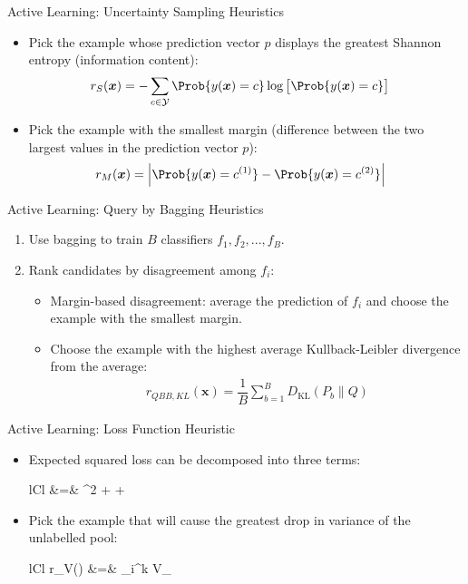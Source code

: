 \documentclass{beamer}
\newcommand{\Y}{\mathcal{Y}}
\newcommand{\Labelled}{\mathcal{L}}
\begin{document}
\begin{frame}{Active Learning: Uncertainty Sampling Heuristics}
	\begin{itemize}
		\item Pick the example whose prediction vector $p$ displays the greatest Shannon entropy
		(information content):
		\begin{align*}
			r_S(\bm{x}) &= -\sum_{c \in \Y} \Prob{y(\bm{x}) = c} \log \big[\Prob{y(\bm{x}) = c} \big]
		\end{align*}
		\item Pick the example with the smallest margin (difference between
		the two largest values in the prediction vector $p$):
		\begin{align*}
			r_M(\bm{x}) &= \Big|  \Prob{y(\bm{x}) = c^{(1)}} -  \Prob{y(\bm{x}) = c^{(2)}} \Big|
		\end{align*}
	\end{itemize}
\end{frame}


\begin{frame}{Active Learning: Query by Bagging Heuristics}
	\begin{enumerate}
		\item Use bagging to train $B$ classifiers $f_1, f_2, ..., f_B$.
		\item Rank candidates by disagreement among $f_i$:
		\begin{itemize}
			\item Margin-based disagreement: average the prediction of $f_i$ and choose the
			example with the smallest margin.
			\item Choose the example with the highest average Kullback-Leibler divergence
			from the average:
			\begin{align*}
				r_{QBB,KL}(\bm{x}) = \dfrac{1}{B} \sum_{b=1}^B D_{\mathrm{KL}}(P_b\|Q)
			\end{align*}
		\end{itemize}	
	\end{enumerate}
\end{frame}

\begin{frame}{Active Learning: Loss Function Heuristic}
	\begin{itemize}
		\item Expected squared loss can be decomposed into three terms:
		\begin{IEEEeqnarray*}{lCl}
			 &=& ^2 +  + 
		\end{IEEEeqnarray*}
		\item Pick the example that will cause the greatest drop in variance of the unlabelled pool:
			\begin{IEEEeqnarray*}{lCl}
				r_V() &=& \sum_i^k  V_{\Labelled \cup {}}
			\end{IEEEeqnarray*}
	\end{itemize}
\end{frame}
\end{document}
